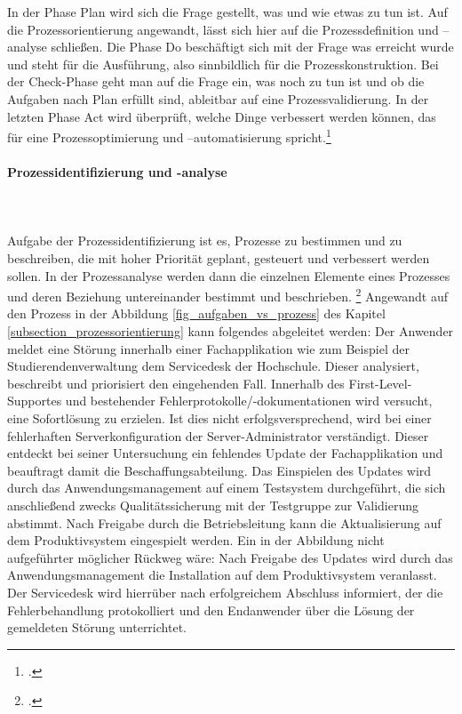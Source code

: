 In der Phase Plan wird sich die Frage gestellt, was und wie etwas zu tun ist. Auf die Prozessorientierung angewandt, lässt sich hier auf die Prozessdefinition und –analyse schließen. Die Phase Do beschäftigt sich mit der Frage was erreicht wurde und steht für die Ausführung, also sinnbildlich für die Prozesskonstruktion. Bei der Check-Phase geht man auf die Frage ein, was noch zu tun ist und ob die Aufgaben nach Plan erfüllt sind, ableitbar auf eine Prozessvalidierung. In der letzten Phase Act wird überprüft, welche Dinge verbessert werden können, das für eine Prozessoptimierung und –automatisierung spricht.\footcite{yasar_kvp_2015}



\paragraph{Prozessidentifizierung und -analyse}\mbox{}\\\\
\label{paragraph_prozessidenifizierung}
Aufgabe der Prozessidentifizierung ist es, Prozesse zu bestimmen und zu beschreiben, die mit hoher Priorität geplant, gesteuert und verbessert werden sollen. In der Prozessanalyse werden dann die einzelnen Elemente eines Prozesses und deren Beziehung untereinander bestimmt und beschrieben. \footcite[Vgl.][276]{heinrich_stelzer_2011}
Angewandt auf den Prozess in der Abbildung \ref{fig_aufgaben_vs_prozess} des Kapitel \ref{subsection_prozessorientierung} kann folgendes abgeleitet werden:
Der Anwender meldet eine Störung innerhalb einer Fachapplikation wie zum Beispiel der Studierendenverwaltung dem Servicedesk der Hochschule. Dieser analysiert, beschreibt und priorisiert den eingehenden Fall. Innerhalb des First-Level-Supportes und bestehender Fehlerprotokolle/-dokumentationen wird versucht, eine Sofortlösung zu erzielen. Ist dies nicht erfolgsversprechend, wird bei einer fehlerhaften Serverkonfiguration der Server-Administrator verständigt. Dieser entdeckt bei seiner Untersuchung ein fehlendes Update der Fachapplikation und beauftragt damit die Beschaffungsabteilung. Das Einspielen des Updates wird durch das Anwendungsmanagement auf einem Testsystem durchgeführt, die sich anschließend zwecks Qualitätssicherung mit der Testgruppe zur Validierung abstimmt. Nach Freigabe durch die Betriebsleitung kann die Aktualisierung auf dem Produktivsystem eingespielt werden.
Ein in der Abbildung nicht aufgeführter möglicher Rückweg wäre: Nach Freigabe des Updates wird durch das Anwendungsmanagement die Installation auf dem Produktivsystem veranlasst. Der Servicedesk wird hierrüber nach erfolgreichem Abschluss informiert, der die Fehlerbehandlung protokolliert und den Endanwender über die Lösung der gemeldeten Störung unterrichtet. 


